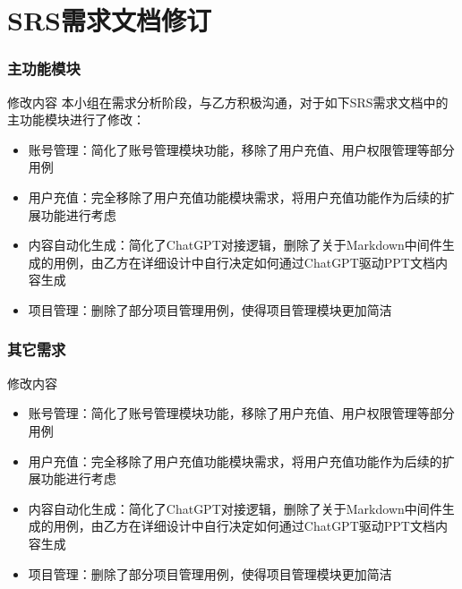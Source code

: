 %
%
%
%
\section{SRS需求文档修订}
    \begin{frame}
    \frametitle{主功能模块}
        \footnotesize
        \begin{block}{修改内容}
            本小组在需求分析阶段，与乙方积极沟通，对于如下SRS需求文档中的主功能模块进行了修改：
            \begin{itemize}
                \item 账号管理：简化了账号管理模块功能，移除了用户充值、用户权限管理等部分用例
                \item 用户充值：完全移除了用户充值功能模块需求，将用户充值功能作为后续的扩展功能进行考虑
                \item 内容自动化生成：简化了ChatGPT对接逻辑，删除了关于Markdown中间件生成的用例，由乙方在详细设计中自行决定如何通过ChatGPT驱动PPT文档内容生成
                \item 项目管理：删除了部分项目管理用例，使得项目管理模块更加简洁
            \end{itemize}
        \end{block}
    \end{frame}

    \begin{frame}
        \frametitle{其它需求}
            \footnotesize
            \begin{block}{修改内容}
                \begin{itemize}
                    \item 账号管理：简化了账号管理模块功能，移除了用户充值、用户权限管理等部分用例
                    \item 用户充值：完全移除了用户充值功能模块需求，将用户充值功能作为后续的扩展功能进行考虑
                    \item 内容自动化生成：简化了ChatGPT对接逻辑，删除了关于Markdown中间件生成的用例，由乙方在详细设计中自行决定如何通过ChatGPT驱动PPT文档内容生成
                    \item 项目管理：删除了部分项目管理用例，使得项目管理模块更加简洁
                \end{itemize}
            \end{block}
        \end{frame}



